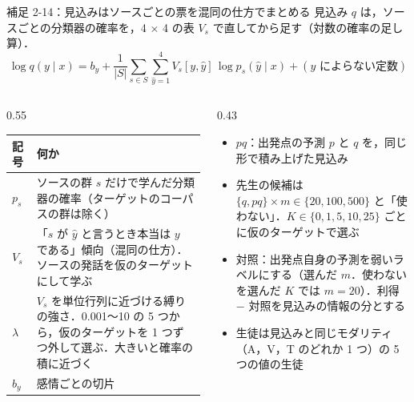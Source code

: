 \begin{frame}{補足 2-14：見込みはソースごとの票を混同の仕方でまとめる}
  \label{s:p2:e59}
  \tighteq\scriptsize
  見込み $q$ は，ソースごとの分類器の確率を，4 × 4 の表 $V_s$ で直してから足す（対数の確率の足し算）．
  \[
    \log q(y\mid x) = b_y + \frac{1}{|S|}\sum_{s\in S}\sum_{\hat y=1}^{4} V_s[y,\hat y]\,\log p_s(\hat y\mid x) + (\text{$y$ によらない定数})
  \]
  \vspace{0.1em}
  \begin{columns}[T,onlytextwidth]
    \begin{column}{0.55\textwidth}
      \setlength{\tabcolsep}{3pt}\renewcommand{\arraystretch}{1.15}
      \begin{tabular}{@{}l p{6.0cm}@{}}
        \toprule
        記号 & 何か \\
        \midrule
        $p_s$ & ソースの群 $s$ だけで学んだ分類器の確率（ターゲットのコーパスの群は除く） \\
        $V_s$ & 「$s$ が $\hat y$ と言うとき本当は $y$ である」傾向（混同の仕方）．ソースの発話を仮のターゲットにして学ぶ \\
        $\lambda$ & $V_s$ を単位行列に近づける縛りの強さ．0.001〜10 の 5 つから，仮のターゲットを 1 つずつ外して選ぶ．大きいと確率の積に近づく \\
        $b_y$ & 感情ごとの切片 \\
        \bottomrule
      \end{tabular}
    \end{column}
    \begin{column}{0.43\textwidth}
      \begin{itemize}\scriptsize\setlength{\itemsep}{4pt}
        \item $pq$：出発点の予測 $p$ と $q$ を，同じ形で積み上げた見込み
        \item 先生の候補は $\{q, pq\}\times m\in\{20,100,500\}$ と「使わない」．$K\in\{0,1,5,10,25\}$ ごとに仮のターゲットで選ぶ
        \item 対照：出発点自身の予測を弱いラベルにする（選んだ $m$．使わないを選んだ $K$ では $m=20$）．利得 − 対照を見込みの情報の分とする
        \item 生徒は見込みと同じモダリティ（A，V，T のどれか 1 つ）の 5 つの値の生徒
      \end{itemize}
    \end{column}
  \end{columns}
\end{frame}

